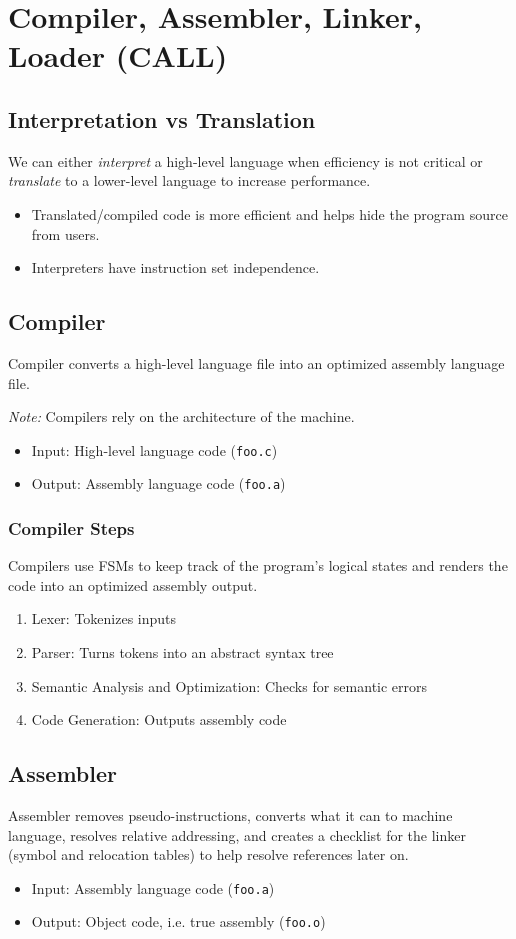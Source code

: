 \chapter{Compiler, Assembler, Linker, Loader (CALL)}

\section{Interpretation vs Translation}
We can either \emph{interpret} a high-level language when efficiency is not critical or \emph{translate} to a lower-level language to increase performance.
\begin{itemize}
    \item Translated/compiled code is more efficient and helps hide the program source from users.
    \item Interpreters have instruction set independence.
\end{itemize}

\section{Compiler}
Compiler converts a high-level language file into an optimized assembly language file. 

\emph{Note:} Compilers rely on the architecture of the machine.
\begin{itemize}
    \item Input: High-level language code (\texttt{foo.c})
    \item Output: Assembly language code (\texttt{foo.a})
\end{itemize}

\subsection{Compiler Steps}
Compilers use FSMs to keep track of the program's logical states and renders the code into an optimized assembly output.
\begin{enumerate}
    \item Lexer: Tokenizes inputs
    \item Parser: Turns tokens into an abstract syntax tree
    \item Semantic Analysis and Optimization: Checks for semantic errors
    \item Code Generation: Outputs assembly code
\end{enumerate}

\section{Assembler}
Assembler removes pseudo-instructions, converts what it can to machine language, resolves relative addressing, and creates a checklist for the linker (symbol and relocation tables) to help resolve references later on.
\begin{itemize}
    \item Input: Assembly language code (\texttt{foo.a})
    \item Output: Object code, i.e. true assembly (\texttt{foo.o})
\end{itemize}

